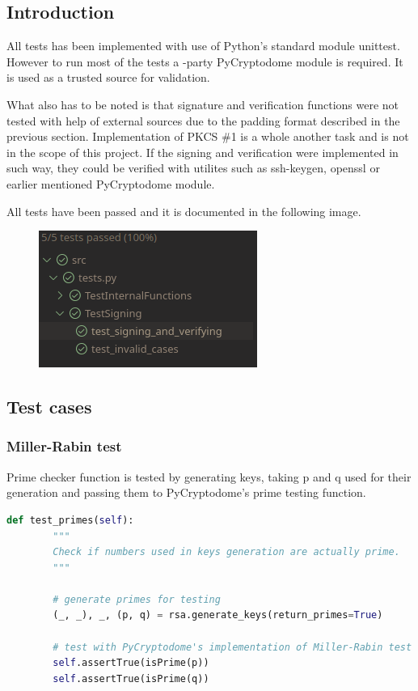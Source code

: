 \documentclass{article}
\begin{document}
\subsection{Introduction}
All tests has been implemented with use of Python's standard module unittest.
However to run most of the tests a -party PyCryptodome module is required.
It is used as a trusted source for validation.

What also has to be noted is that signature and verification functions were not tested
with help of external sources due to the padding format described in the previous section.
Implementation of PKCS \#1 is a whole another task and is not in the scope of this project.
If the signing and verification were implemented in such way, they could be verified with utilites
such as ssh-keygen, openssl or earlier mentioned PyCryptodome module.

All tests have been passed and it is documented in the following image.

\newpage

\begin{figure}[h!] %
    \centering
        \includegraphics[width=0.5\linewidth]{passed_tests.png}
\end{figure}


\subsection{Test cases}
\subsubsection{Miller-Rabin test}
Prime checker function is tested by generating keys, taking p and q used for their generation
and passing them to PyCryptodome's prime testing function.

\small

\begin{lstlisting}[language=Python]
    def test_primes(self):
        """
        Check if numbers used in keys generation are actually prime.
        """

        # generate primes for testing
        (_, _), _, (p, q) = rsa.generate_keys(return_primes=True)

        # test with PyCryptodome's implementation of Miller-Rabin test
        self.assertTrue(isPrime(p))
        self.assertTrue(isPrime(q))
\end{lstlisting}
\end{document}
